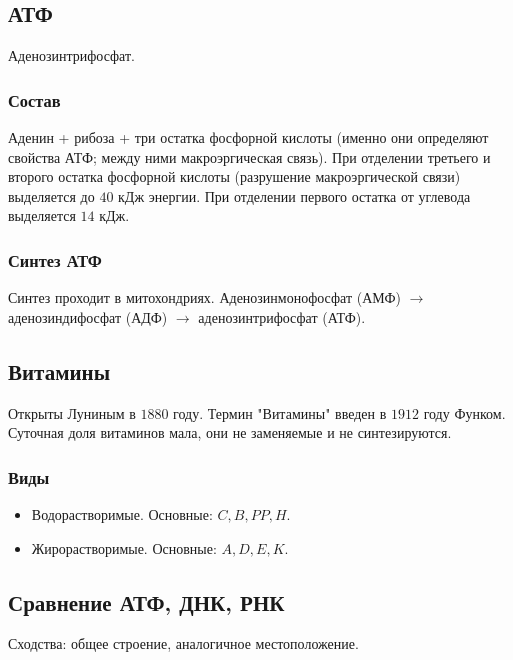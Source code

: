 \documentclass[12pt]{article}
\begin{document}
	\subsection{АТФ}
	Аденозинтрифосфат.
	\subsubsection{Состав}
	Аденин + рибоза + три остатка фосфорной кислоты (именно они определяют свойства АТФ; между ними макроэргическая связь). При отделении третьего и второго остатка фосфорной кислоты (разрушение макроэргической связи) выделяется до $40$ кДж энергии. При отделении первого остатка от углевода выделяется $14$ кДж.
	\subsubsection{Синтез АТФ}
	Синтез проходит в митохондриях. Аденозинмонофосфат (АМФ) $\rightarrow$ аденозиндифосфат (АДФ) $\rightarrow$ аденозинтрифосфат (АТФ).
	\subsection{Витамины}
	Открыты Луниным в $1880$ году. Термин "Витамины" введен в $1912$ году Функом.\\
	Суточная доля витаминов мала, они не заменяемые и не синтезируются.
	\subsubsection{Виды}
	\begin{itemize}
		\item Водорастворимые. Основные: $C, B, PP, H$.
		\item Жирорастворимые. Основные: $A, D, E, K$.
	\end{itemize}
	\subsection{Сравнение АТФ, ДНК, РНК}
	Сходства: общее строение, аналогичное местоположение.
\end{document}

